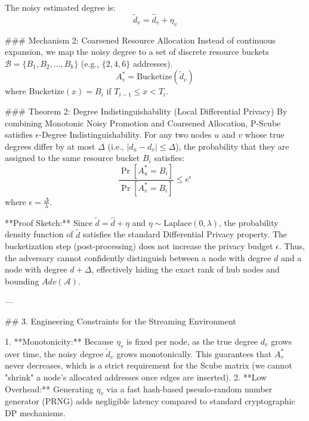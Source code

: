 The noisy estimated degree is:
$$ \tilde{d}_v = \hat{d}_v + \eta_v $$

### Mechanism 2: Coarsened Resource Allocation
Instead of continuous expansion, we map the noisy degree to a set of discrete resource buckets $\mathcal{B} = \{B_1, B_2, \dots, B_k\}$ (e.g., $\{2, 4, 6\}$ addresses).
$$ A_v^* = \text{Bucketize}(\tilde{d}_v) $$
where $\text{Bucketize}(x) = B_i$ if $T_{i-1} \le x < T_i$.

### Theorem 2: Degree Indistinguishability (Local Differential Privacy)
By combining Monotonic Noisy Promotion and Coarsened Allocation, P-Scube satisfies $\epsilon$-Degree Indistinguishability. 
For any two nodes $u$ and $v$ whose true degrees differ by at most $\Delta$ (i.e., $|d_u - d_v| \le \Delta$), the probability that they are assigned to the same resource bucket $B_i$ satisfies:
$$ \frac{\Pr[A_u^* = B_i]}{\Pr[A_v^* = B_i]} \le e^{\epsilon} $$
where $\epsilon = \frac{\Delta}{\lambda}$.

**Proof Sketch:**
Since $\tilde{d} = \hat{d} + \eta$ and $\eta \sim \text{Laplace}(0, \lambda)$, the probability density function of $\tilde{d}$ satisfies the standard Differential Privacy property. The bucketization step (post-processing) does not increase the privacy budget $\epsilon$. Thus, the adversary cannot confidently distinguish between a node with degree $d$ and a node with degree $d + \Delta$, effectively hiding the exact rank of hub nodes and bounding $Adv(\mathcal{A})$.

---

## 3. Engineering Constraints for the Streaming Environment

1. **Monotonicity:** Because $\eta_v$ is fixed per node, as the true degree $d_v$ grows over time, the noisy degree $\tilde{d}_v$ grows monotonically. This guarantees that $A_v^*$ never decreases, which is a strict requirement for the Scube matrix (we cannot "shrink" a node's allocated addresses once edges are inserted).
2. **Low Overhead:** Generating $\eta_v$ via a fast hash-based pseudo-random number generator (PRNG) adds negligible latency compared to standard cryptographic DP mechanisms.